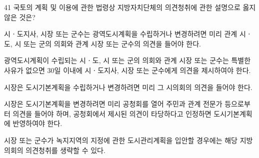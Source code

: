 \begin{question}{41}
국토의 계획 및 이용에 관한 법령상 지방자치단체의 의견청취에 관한 설명으로 옳지 않은 것은?
\begin{choices}
  \item 시ㆍ도지사, 시장 또는 군수는 광역도시계획을 수립하거나 변경하려면 미리 관계 시ㆍ도, 시 또는 군의 의회와 관계 시장 또는 군수의 의견을 들어야 한다.
  \item 광역도시계획이 수립되는 시ㆍ도, 시 또는 군의 의회와 관계 시장 또는 군수는 특별한 사유가 없으면 30일 이내에 시ㆍ도지사, 시장 또는 군수에게 의견을 제시하여야 한다.
  \item 시장은 도시기본계획을 수립하거나 변경하려면 미리 그 시의회의 의견을 들어야 한다.
  \item 시장은 도시기본계획을 변경하려면 미리 공청회를 열어 주민과 관계 전문가 등으로부터 의견을 들어야 하며, 공청회에서 제시된 의견이 타당하다고 인정하면 도시기본계획에 반영하여야 한다.
  \item 시장 또는 군수가 녹지지역의 지정에 관한 도시관리계획을 입안할 경우에는 해당 지방의회의 의견청취를 생략할 수 있다.
\end{choices}
\end{question}

